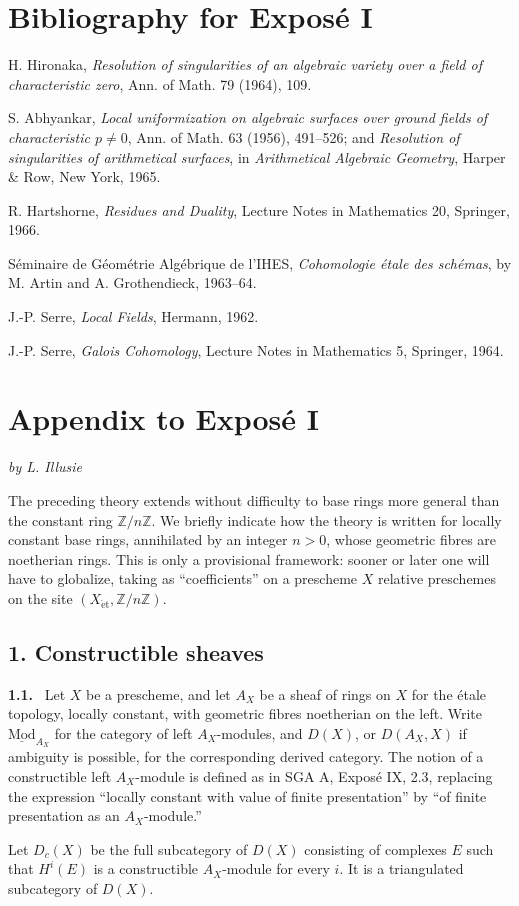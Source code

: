 \documentclass[11pt]{article}
\theoremstyle{plain}
\theoremstyle{definition}
\theoremstyle{remark}
\newenvironment{statement}[1]{\par\medskip\noindent\textbf{#1.}\ }{\par\medskip}
\newcommand{\ZZ}{\mathbb Z}
\begin{document}
\section*{Bibliography for Exposé I}
\begin{enumerate}[label={[\arabic*]}]
\item H. Hironaka, \emph{Resolution of singularities of an algebraic variety over a field of characteristic zero}, Ann. of Math. 79 (1964), 109.
\item S. Abhyankar, \emph{Local uniformization on algebraic surfaces over ground fields of characteristic $p\ne0$}, Ann. of Math. 63 (1956), 491--526; and \emph{Resolution of singularities of arithmetical surfaces}, in \emph{Arithmetical Algebraic Geometry}, Harper \& Row, New York, 1965.
\item R. Hartshorne, \emph{Residues and Duality}, Lecture Notes in Mathematics 20, Springer, 1966.
\item[SGA A] Séminaire de Géométrie Algébrique de l'IHES, \emph{Cohomologie étale des schémas}, by M. Artin and A. Grothendieck, 1963--64.
\item[CL] J.-P. Serre, \emph{Local Fields}, Hermann, 1962.
\item[CG] J.-P. Serre, \emph{Galois Cohomology}, Lecture Notes in Mathematics 5, Springer, 1964.
\end{enumerate}

\section*{Appendix to Exposé I}
\emph{by L. Illusie}

The preceding theory extends without difficulty to base rings more general than the constant ring $\ZZ/n\ZZ$. We briefly indicate how the theory is written for locally constant base rings, annihilated by an integer $n>0$, whose geometric fibres are noetherian rings. This is only a provisional framework: sooner or later one will have to globalize, taking as ``coefficients'' on a prescheme $X$ relative preschemes on the site $(X_{\mathrm{\acute et}},\ZZ/n\ZZ)$.

\subsection*{1. Constructible sheaves}

\begin{statement}{1.1}
Let $X$ be a prescheme, and let $A_X$ be a sheaf of rings on $X$ for the étale topology, locally constant, with geometric fibres noetherian on the left. Write $\underline{\mathrm{Mod}}_{A_X}$ for the category of left $A_X$-modules, and $D(X)$, or $D(A_X,X)$ if ambiguity is possible, for the corresponding derived category. The notion of a constructible left $A_X$-module is defined as in SGA A, Exposé IX, 2.3, replacing the expression ``locally constant with value of finite presentation'' by ``of finite presentation as an $A_X$-module.''

Let $D_c(X)$ be the full subcategory of $D(X)$ consisting of complexes $E$ such that $H^i(E)$ is a constructible $A_X$-module for every $i$. It is a triangulated subcategory of $D(X)$.
\end{statement}
\end{document}
